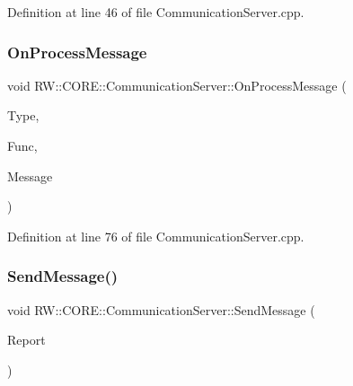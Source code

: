 Definition at line 46 of file Communication\+Server.\+cpp.

\hypertarget{class_r_w_1_1_c_o_r_e_1_1_communication_server_a623ab8380a69de4f849c284e808b30c0}{}\label{class_r_w_1_1_c_o_r_e_1_1_communication_server_a623ab8380a69de4f849c284e808b30c0} 
\subsubsection{\texorpdfstring{On\+Process\+Message}{OnProcessMessage}}
{\footnotesize\ttfamily void R\+W\+::\+C\+O\+R\+E\+::\+Communication\+Server\+::\+On\+Process\+Message (\begin{DoxyParamCaption}\item[{Util\+::\+Message\+Receiver}]{Type,  }\item[{Util\+::\+Functions}]{Func,  }\item[{Q\+Byte\+Array}]{Message }\end{DoxyParamCaption})\hspace{0.3cm}{\ttfamily [slot]}}



Definition at line 76 of file Communication\+Server.\+cpp.

\hypertarget{class_r_w_1_1_c_o_r_e_1_1_communication_server_a731de143323e7949781411506ed57891}{}\label{class_r_w_1_1_c_o_r_e_1_1_communication_server_a731de143323e7949781411506ed57891} 
\subsubsection{\texorpdfstring{Send\+Message()}{SendMessage()}}
{\footnotesize\ttfamily void R\+W\+::\+C\+O\+R\+E\+::\+Communication\+Server\+::\+Send\+Message (\begin{DoxyParamCaption}\item[{Q\+Byte\+Array}]{Report }\end{DoxyParamCaption})\hspace{0.3cm}{\ttfamily [private]}}



